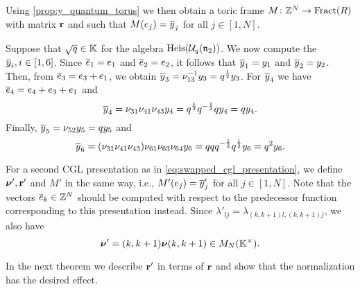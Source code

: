 Using \cref{prop:y_quantum_torus} we then obtain a toric frame $M \colon \mathbb{Z}^N \to
	\operatorname{Fract}(R)$ with matrix $\mathbf{r}$ and such that $M(e_j) = \overline{y}_j$ for all $j \in [1, N]$.

\begin{example}\label{exmp:heisenberg_y_normalization}

	Suppose that $\sqrt{q} \in \mathbb{K}$ for the algebra $\operatorname{Heis}(\mathcal{U}_q(\mathfrak{n}_2))$. We
	now compute the $\overline{y}_i, i\in [1,6]$. Since $\overline{e}_1 = e_1$ and $\overline{e}_2 = e_2$, it follows
	that $\overline{y}_1 = y_1$ and $\overline{y}_2 = y_2$. Then, from $\overline{e}_3 = e_3 + e_1$, we obtain $\overline{y}_3
		= \nu_{13}^{-1} y_3 = q^{\frac{1}{2}}y_3$. For $\overline{y}_4$ we have $\overline{e}_4 = e_4 + e_3 + e_1$
	and
	\begin{equation*}
		\overline{y}_4 = \nu_{31}\nu_{41}\nu_{43}y_4 = q^{\frac{1}{2}}q^{-\frac{1}{2}}q y_4 = qy_4.
	\end{equation*}
	Finally, $\overline{y}_5 = \nu_{52}y_5 = q y_5$ and
	\begin{equation*}
		\overline{y}_6 = (\nu_{31}\nu_{41}\nu_{43})\nu_{61}\nu_{63}\nu_{64} y_6 = q qq^{-\frac{1}{2}}q^{\frac{1}{2}}y_6 = q^2 y_6.
	\end{equation*}
\end{example}

For a second CGL presentation as in \cref{eq:swapped_cgl_presentation}, we define
$\boldsymbol{\nu}', \mathbf{r}'$ and $M'$ in the same way, i.e., $M'(e_j) = \overline{y}'_j$ for all $j \in [1,
		N]$. Note that the vectors $\overline{e}_k \in \mathbb{Z}^N$ should be computed with respect to the
predecessor function corresponding to this presentation instead. Since $\lambda'_{lj} =
	\lambda_{(k, k+1)l, (k, k+1)j}$, we also have
\begin{equation*}
	\boldsymbol{\nu}' = (k, k+1)\boldsymbol{\nu} (k, k+1) \in M_N(\mathbb{K}^\times).
\end{equation*}

In the next theorem we describe $\mathbf{r}'$ in terms of $\mathbf{r}$ and show that the
normalization has the desired effect.

